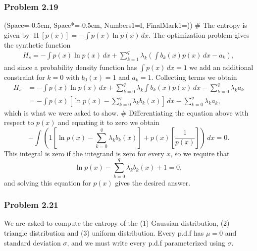\documentclass[12pt, a4paper]{article}
\newcommand{\listSpace}{-0.5em}%
\renewcommand{\H}{\operatorname{H}}
\begin{document}
\subsubsection*{Problem 2.19}
\begin{easylist}[enumerate]
\ListProperties(Space=\listSpace, Space*=\listSpace, Numbers1=l, FinalMark1={)})
# The entropy is given by $\H\left[p(x)\right] = - \int p(x) \ln p(x) \, dx$.
The optimization problem gives the synthetic function
\begin{align*}
	H_s = - \int p(x) \ln p(x) \, dx + \sum_{k=1} ^{q} \lambda_k \left( \int b_k(x) p(x) \, dx - a_k \right),
\end{align*}
and since a probability density function has $\int p(x) \, dx = 1$ we add an additional constraint for $k=0$ with $b_0(x) = 1$ and $a_k = 1$.
Collecting terms we obtain
\begin{align*}
H_s &= - \int p(x) \ln p(x) \, dx + \sum_{k=0} ^{q} \lambda_k  \int b_k(x) p(x) \, dx - \sum_{k=0} ^{q} \lambda_k a_k  \\
&= - \int p(x) 
\left[ \ln p(x) - \sum_{k=0} ^{q} \lambda_k b_k(x) \right] \, dx - \sum_{k=0} ^{q} \lambda_k a_k ,
\end{align*}
which is what we were asked to show.
# Differentiating the equation above with respect to $p(x)$ and equating it to zero we obtain
\begin{equation*}
	- \int \left(  1 \left[ \ln p(x) - \sum_{k=0} ^{q} \lambda_k b_k(x) \right] + p(x) \left[ \frac{1}{p(x)} \right] \right) \, dx = 0.
\end{equation*}
This integral is zero if the integrand is zero for every $x$, so we require that
\begin{equation*}
	 \ln p(x) - \sum_{k=0} ^{q} \lambda_k b_k(x) + 1 = 0,
\end{equation*}
and solving this equation for $p(x)$ gives the desired answer.
\end{easylist}

\subsubsection*{Problem 2.21}
We are asked to compute the entropy of the (1) Gaussian distribution, (2) triangle distribution and (3) uniform distribution. 
Every p.d.f has $\mu = 0$ and standard deviation $\sigma$, and we must write every p.d.f parameterized using $\sigma$.
\end{document}
